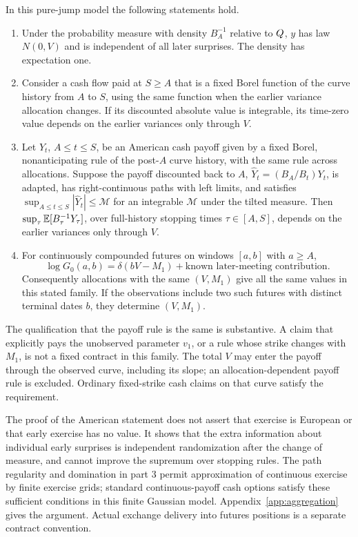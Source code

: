 \begin{theorem}\label{thm:aggregate}
In this pure-jump model the following statements hold.
\begin{enumerate}
\item Under the probability measure with density $B_A^{-1}$ relative to $Q$, $y$ has law $N(0,V)$ and is independent of all later surprises. The density has expectation one.
\item Consider a cash flow paid at $S\geq A$ that is a fixed Borel function of the curve history from $A$ to $S$, using the same function when the earlier variance allocation changes. If its discounted absolute value is integrable, its time-zero value depends on the earlier variances only through $V$.
\item Let $Y_t$, $A\leq t\leq S$, be an American cash payoff given by a fixed Borel, nonanticipating rule of the post-$A$ curve history, with the same rule across allocations. Suppose the payoff discounted back to $A$, $\widehat Y_t=(B_A/B_t)Y_t$, is adapted, has right-continuous paths with left limits, and satisfies $\sup_{A\leq t\leq S}|\widehat Y_t|\leq\mathcal M$ for an integrable $\mathcal M$ under the tilted measure. Then $\sup_\tau\mathbb E[B_\tau^{-1}Y_\tau]$, over full-history stopping times $\tau\in[A,S]$, depends on the earlier variances only through $V$.
\item For continuously compounded futures on windows $[a,b]$ with $a\geq A$,
\begin{equation}\label{eq:futureVH}
\log G_0(a,b)=\delta(bV-M_1)+\text{known later-meeting contribution}.
\end{equation}
Consequently allocations with the same $(V,M_1)$ give all the same values in this stated family. If the observations include two such futures with distinct terminal dates $b$, they determine $(V,M_1)$.
\end{enumerate}
\end{theorem}
The qualification that the payoff rule is the same is substantive. A claim that explicitly pays the unobserved parameter $v_1$, or a rule whose strike changes with $M_1$, is not a fixed contract in this family. The total $V$ may enter the payoff through the observed curve, including its slope; an allocation-dependent payoff rule is excluded. Ordinary fixed-strike cash claims on that curve satisfy the requirement.

The proof of the American statement does not assert that exercise is European or that early exercise has no value. It shows that the extra information about individual early surprises is independent randomization after the change of measure, and cannot improve the supremum over stopping rules. The path regularity and domination in part 3 permit approximation of continuous exercise by finite exercise grids; standard continuous-payoff cash options satisfy these sufficient conditions in this finite Gaussian model. Appendix~\ref{app:aggregation} gives the argument. Actual exchange delivery into futures positions is a separate contract convention.

